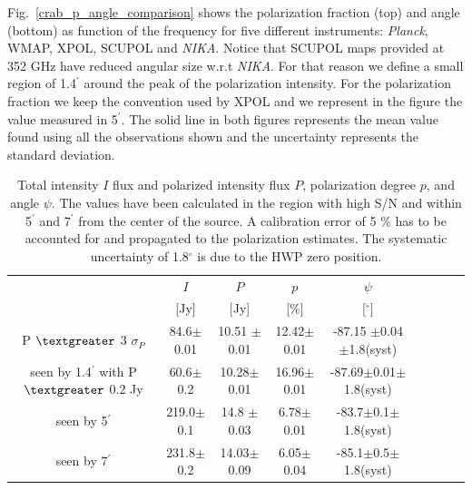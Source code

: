 \documentclass[twocolumn,traditabstract]{aa}
\def\NIKA{\textit{NIKA}}
\def\Planck{\textit{Planck}}
\begin{document}
Fig.~\ref{crab_p_angle_comparison} shows the polarization fraction (top) and angle (bottom) as function of the frequency for five different instruments: \Planck, WMAP, XPOL, SCUPOL and \NIKA. Notice that SCUPOL maps \citep{scubapol} provided at 352 GHz have reduced angular size w.r.t \NIKA. For that reason we define a small region of 1.4$^\prime$ around the peak of the polarization intensity. 
For the polarization fraction we keep the convention used by XPOL \citep{aumont2010} and we represent in the figure the value measured in 5$^{\prime}$. 
The solid line in both figures represents the mean value found using all the observations shown and the uncertainty represents the standard deviation. 

\begin{table}
  \centering
      \begin{tabular}{ccccccccc}
      \hline
      \hline
       & $I$ & $P$ & $p$ & $\psi$  \\ 
                                         & [Jy]         &    [Jy]         & [\%]  & [$^\circ$] \\
      \hline
      \hline
      P $\textgreater$ 3 $\sigma_P$     & 84.6$\pm$0.01  & 10.51 $\pm$0.01 &12.42$\pm$0.01 & -87.15 $\pm$0.04$\pm$1.8(syst) \\
     	      
              seen by 1.4$^{\prime}$ with P $\textgreater$ 0.2 Jy& 60.6$\pm$0.2 & 10.28$\pm$0.01  & 16.96$\pm$0.01 &-87.69$\pm$0.01$\pm$1.8(syst)\\
              
             seen by 5$^{\prime}$ & 219.0$\pm$0.1  & 14.8 $\pm$0.03 & 6.78$\pm$0.01 & -83.7$\pm$0.1$\pm$1.8(syst)    \\ 
              
    seen by 7$^{\prime}$   & 231.8$\pm$0.2  & 14.03$\pm$0.09 & 6.05$\pm$0.04 & -85.1$\pm$0.5$\pm$1.8(syst)  \\ 
            \hline
    \hline   
    \end{tabular}
   \caption{ Total intensity $I$ flux and  polarized intensity flux $P$, polarization degree $p$, and angle $\psi$. The values have been calculated in the region with high S/N and within 5$^{\prime}$ and 7$^{\prime}$ from the center of the source. A calibration error of 5 $\%$ has to be accounted for and propagated to the polarization estimates. The systematic uncertainty of 1.8$^{\circ}$ is due to the HWP zero position.}
    \label{tab:crab_results}
 \end{table}
  
\end{document}

